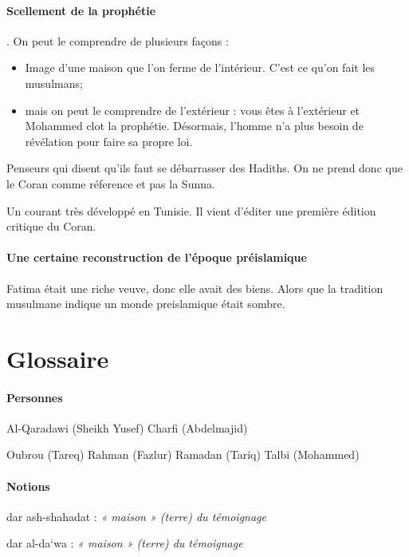     \paragraph{Scellement de la prophétie}. On peut le comprendre de plusieurs façons : 
    \begin{itemize}
        \item Image d'une maison que l'on ferme de l'intérieur. C'est ce qu'on fait les musulmans;
        \item mais on peut le comprendre de l'extérieur : vous êtes à l'extérieur et Mohammed clot la prophétie. Désormais, l'homme n'a plus besoin de révélation pour faire sa propre loi.
    \end{itemize}
    
    \begin{Def}[Coraniste]
    Penseurs qui disent qu'ils faut se débarrasser des Hadiths. On ne prend donc que le Coran comme réference et pas la Sunna.
    \end{Def}
    Un courant très développé en Tunisie. Il vient d'éditer une première édition critique du Coran.
    
    \paragraph{Une certaine reconstruction de l'époque préislamique} Fatima était une riche veuve, donc elle avait des biens. Alors que la tradition musulmane indique un monde preislamique était sombre.
  



\section{{Glossaire}}

\paragraph{Personnes}

Al-Qaradawi (Sheikh Yusef) Charfi (Abdelmajid)

Oubrou (Tareq) Rahman (Fazlur) Ramadan (Tariq) Talbi (Mohammed)

\paragraph{Notions}

dar ash-shahadat : \emph{« maison » (terre) du témoignage}

dar al-da`wa : \emph{« maison » (terre) du témoignage}

